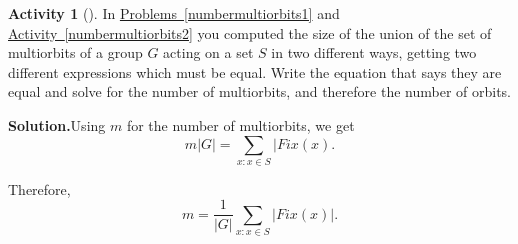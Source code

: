 \documentclass[10pt,]{book}
\theoremstyle{plain}
\theoremstyle{definition}
\newtheorem{activity}[project]{Activity}
\numberwithin{equation}{chapter}
\begin{document}
\begin{activity}[]\label{numbermultiorbits3}
In \hyperref[numbermultiorbits1]{Problems~\ref{numbermultiorbits1}} and \hyperref[numbermultiorbits2]{Activity~\ref{numbermultiorbits2}} you computed the size of the union of the set of multiorbits of a group \(G\) acting on a set \(S\) in two different ways, getting two different expressions which must be equal. Write the equation that says they are equal and solve for the number of multiorbits, and therefore the number of orbits.%
\par\medskip\noindent%
\textbf{Solution.}\quad Using \(m\) for the number of multiorbits, we get%
\begin{equation*}
m|G|=\sum_{x:x\in S} |{ Fix}(x).
\end{equation*}
%
\par
Therefore,%
\begin{equation*}
m=\frac{1}{|G|}\sum_{x:x\in S} |{ Fix}(x)|.
\end{equation*}
%
\end{activity}
\typeout{************************************************}
\typeout{************************************************}
\end{document}
